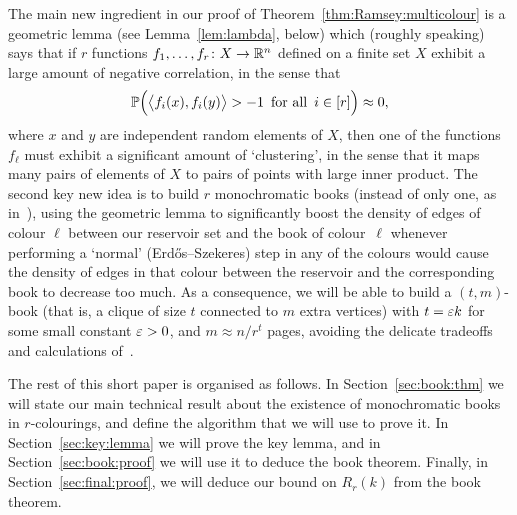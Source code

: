 The main new ingredient in our proof of Theorem~\ref{thm:Ramsey:multicolour} %
is a geometric lemma (see Lemma~\ref{lem:lambda}, below) which (roughly speaking) says that if $r$ functions $f_1,\ldots,f_r \colon X \rightarrow \mathbb{R}^n$ defined on a finite set $X$ exhibit a large amount of negative correlation, in the sense that 
$$\mathbb{P}\Big( \big\langle f_i(x), f_i(y) \big\rangle > - 1 \,\text{ for all }\, i \in [r] \Big) \approx 0,$$
where $x$ and $y$ are independent random elements of $X$, then one of the functions $f_\ell$ must exhibit a significant amount of `clustering', in the sense that it maps many pairs of elements of $X$ to pairs of points with large inner product. The second key new idea is to build $r$ monochromatic books (instead of only one, as in~\cite{CGMS}), using the geometric lemma to significantly boost the density of edges of colour $\ell$ between our reservoir set and the book of colour~$\ell$ whenever performing a `normal' (Erd\H{o}s--Szekeres) step in any of the colours would cause the density of edges in that colour between the reservoir and the corresponding book to decrease too much. As a consequence, we will be able to build a $(t,m)$-book (that is, a clique of size $t$ connected to $m$ extra vertices) with $t = \varepsilon k$ for some small constant $\varepsilon > 0$, and $m \approx n / r^t$ pages, avoiding the delicate tradeoffs and calculations of~\cite{CGMS}. 

The rest of this short paper is organised as follows. In Section~\ref{sec:book:thm} we will state our main technical result about the existence of monochromatic books in $r$-colourings, and define the algorithm that we will use to prove it. In Section~\ref{sec:key:lemma} we will prove the key lemma, and in Section~\ref{sec:book:proof} we will use it to deduce the book theorem. Finally, in Section~\ref{sec:final:proof}, we will deduce our bound on $R_r(k)$ from the book theorem.